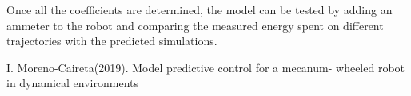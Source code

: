 \documentclass[twoside,onecolumn]{article}
\begin{document}
Once all the coefficients are determined, the model can be tested by adding an ammeter to the robot and comparing the measured energy spent on different trajectories with the predicted simulations.

\begin{thebibliography}{99} %

I. Moreno-Caireta(2019).
\newblock Model predictive control for a mecanum- wheeled robot in dynamical environments
 
\end{thebibliography}

\end{document}
